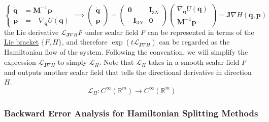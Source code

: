       \begin{equation}
        \begin{cases} \boldsymbol{\dot{q}} & = \mathbf{M}^{-1} \mathbf{p} \\
        \boldsymbol{\dot{p}} & = - \nabla_\mathbf{q} U(\mathbf{q}) \end{cases} \implies \begin{pmatrix} \boldsymbol{\dot{q}} \\ \boldsymbol{\dot{p}} \end{pmatrix} = \begin{pmatrix} \mathbf{0} & \mathbf{I}_{3N} \\ -\mathbf{I}_{3N} & \mathbf{0} \end{pmatrix} \begin{pmatrix} \nabla_\mathbf{q} U (\mathbf{q})\\ \mathbf{M}^{-1} \mathbf{p} \end{pmatrix} = \mathbf{J} \nabla H(\mathbf{q}, \mathbf{p})
      \end{equation}
      the Lie derivative $\mathcal{L}_{\mathbf{J} \nabla H} F$ under scalar field $F$ can be represented in terms of the \hyperref[sm-def:lie-bracket]{Lie bracket} $\{F, H\}$, and therefore $\exp(t \mathcal{L}_{\mathbf{J} \nabla H})$ can be regarded as the Hamiltonian flow of the system. Following the convention, we will simplify the expression $\mathcal{L}_{\mathbf{J} \nabla H}$ to simply $\mathcal{L}_H$. Note that $\mathcal{L}_H$ takes in a smooth scalar field $F$ and outputs another scalar field that tells the directional derivative in direction $H$. 
      \begin{equation}
        \mathcal{L}_H: C^\infty (\mathbb{R}^m) \to C^\infty (\mathbb{R}^m)
      \end{equation}

    \subsubsection{Backward Error Analysis for Hamiltonian Splitting Methods}

